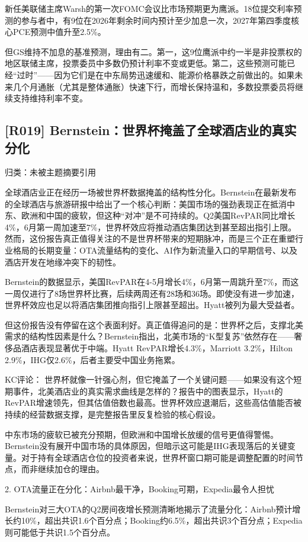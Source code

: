 \documentclass[11pt]{ctexart}
\begin{document}
新任美联储主席Warsh的第一次FOMC会议比市场预期更为鹰派。18位提交利率预测的参与者中，有9位在2026年剩余时间内预计至少加息一次，2027年第四季度核心PCE预测中值升至2.5\%。

但GS维持不加息的基准预测，理由有二。第一，这9位鹰派中约一半是非投票权的地区联储主席，投票委员中多数仍预计利率不变或更低。第二，这些预测可能已经“过时”——因为它们是在中东局势迅速缓和、能源价格暴跌之前做出的。如果未来几个月通胀（尤其是整体通胀）快速下行，而增长保持温和，多数投票委员将继续支持维持利率不变。

\subsection{[R019] Bernstein：世界杯掩盖了全球酒店业的真实分化}
{\small\color{refgray}归类：未被主题摘要引用}

全球酒店业正在经历一场被世界杯数据掩盖的结构性分化。Bernstein在最新发布的全球酒店与旅游研报中给出了一个核心判断：美国市场的强劲表现正在抵消中东、欧洲和中国的疲软，但这种“对冲”是不可持续的。Q2美国RevPAR同比增长4\%，6月第一周加速至7\%，世界杯效应将推动酒店集团达到甚至超出指引上限。然而，这份报告真正值得关注的不是世界杯带来的短期脉冲，而是三个正在重塑行业格局的长期变量：OTA流量结构的变化、AI作为新流量入口的早期信号、以及酒店开发在地缘冲突下的韧性。

Bernstein的数据显示，美国RevPAR在4-5月增长4\%，6月第一周跳升至7\%，而这一周仅进行了8场世界杯比赛，后续两周还有28场和36场。即使没有进一步加速，世界杯效应也足以将酒店集团推向指引上限甚至超出。Hyatt被列为最大受益者。

但这份报告没有停留在这个表面利好。真正值得追问的是：世界杯之后，支撑北美需求的结构性因素是什么？Bernstein指出，北美市场的“K型复苏”依然存在——奢侈品酒店表现显著优于中端。Hyatt RevPAR增长4.3\%，Marriott 3.2\%，Hilton 2.9\%，IHG仅2.6\%，后者主要受中国业务拖累。

KC评论： 世界杯就像一针强心剂，但它掩盖了一个关键问题——如果没有这个短期事件，北美酒店业的真实需求曲线是怎样的？报告中的图表显示，Hyatt的RevPAR增速领先，但其估值倍数也最高。世界杯效应退潮后，这些高估值能否被持续的经营数据支撑，是完整报告里反复检验的核心假设。

中东市场的疲软已被充分预期，但欧洲和中国增长放缓的信号更值得警惕。Bernstein没有展开中国市场的具体原因，但暗示这可能是IHG表现落后的关键变量。对于持有全球酒店仓位的投资者来说，世界杯窗口期可能是调整配置的时间节点，而非继续加仓的理由。

2. OTA流量正在分化：Airbnb最干净，Booking可期，Expedia最令人担忧

Bernstein对三大OTA的Q2房间夜增长预测清晰地揭示了流量分化：Airbnb预计增长约10\%，超出共识1.6个百分点；Booking约6.5\%，超出共识3个百分点；Expedia则可能低于共识1.5个百分点。
\end{document}
